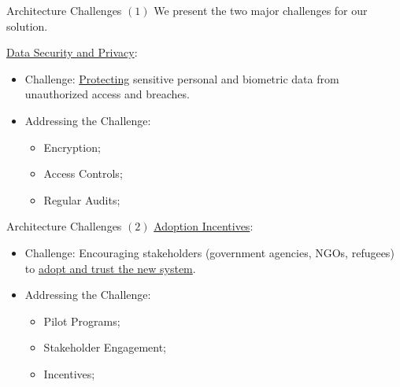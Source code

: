 \documentclass{beamer}
\begin{document}
\begin{frame}{Architecture Challenges $(1)$}
We present the two major challenges for our solution.\newline 


\underline{Data Security and Privacy}:
\begin{itemize}
\item Challenge: \underline{Protecting} sensitive personal and biometric data from unauthorized access and breaches.
\item Addressing the Challenge:
	\begin{itemize}
		\item Encryption; 
		\item Access Controls; 
		\item Regular Audits; 
	\end{itemize}
\end{itemize}
\end{frame}


\begin{frame}{Architecture Challenges $(2)$}
\underline{Adoption Incentives}:
\begin{itemize}
\item Challenge: Encouraging stakeholders (government agencies, NGOs, refugees) to \underline{adopt and trust the new system}.
\item Addressing the Challenge:
	\begin{itemize}
		\item Pilot Programs; 
		\item Stakeholder Engagement; 
		\item Incentives; 
	\end{itemize}
\end{itemize}
\end{frame}
\end{document}
